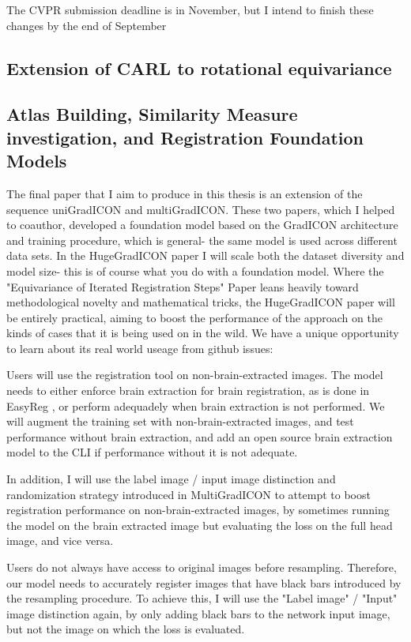 \documentclass{article}
\begin{document}
The CVPR submission deadline is in November, but I intend to finish these changes by the end of September

\subsection{Extension of CARL to rotational equivariance}







\subsection{Atlas Building, Similarity Measure investigation, and Registration Foundation Models}

The final paper that I aim to produce in this thesis is an extension of the sequence uniGradICON and multiGradICON. These two papers, which I helped to coauthor, developed a foundation model based on the GradICON architecture and training procedure, which is general- the same model is used across different data sets. In the HugeGradICON paper I will scale both the dataset diversity and model size- this is of course what you do with a foundation model. Where the "Equivariance of Iterated Registration Steps" Paper leans heavily toward methodological novelty and mathematical tricks, the HugeGradICON paper will be entirely practical, aiming to boost the performance of the approach on the kinds of cases that it is being used on in the wild. We have a unique opportunity to learn about its real world useage from github issues:

Users will use the registration tool on non-brain-extracted images. The model needs to either enforce brain extraction for brain registration, as is done in EasyReg \cite{easyReg}, or perform adequadely when brain extraction is not performed. We will augment the training set with non-brain-extracted images, and test performance without brain extraction, and add an open source brain extraction model to the CLI if performance without it is not adequate.

In addition, I will use the label image / input image distinction and randomization strategy introduced in MultiGradICON to attempt to boost registration performance on non-brain-extracted images, by sometimes running the model on the brain extracted image but evaluating the loss on the full head image, and vice versa.

Users do not always have access to original images before resampling. Therefore, our model needs to accurately register images that have black bars introduced by the resampling procedure. To achieve this, I will use the "Label image" / "Input" image distinction again, by only adding black bars to the network input image, but not the image on which the loss is evaluated.
\end{document}
